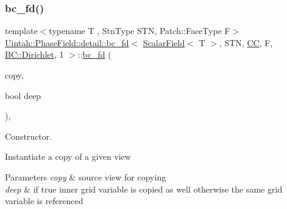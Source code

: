 \subsubsection{\texorpdfstring{bc\+\_\+fd()}{bc\_fd()}\hspace{0.1cm}{\footnotesize\ttfamily [1/3]}}
{\footnotesize\ttfamily template$<$typename T , Stn\+Type S\+TN, Patch\+::\+Face\+Type F$>$ \\
\hyperlink{classUintah_1_1PhaseField_1_1detail_1_1bc__fd}{Uintah\+::\+Phase\+Field\+::detail\+::bc\+\_\+fd}$<$ \hyperlink{structUintah_1_1PhaseField_1_1ScalarField}{Scalar\+Field}$<$ T $>$, S\+TN, \hyperlink{namespaceUintah_1_1PhaseField_a33d355affda78a83f45755ba8388cedda22303704507d024d1d6508ed9859a85a}{CC}, F, \hyperlink{namespaceUintah_1_1PhaseField_a148fba372aa3be96fd6eede7a2fa10b5abac152b762896edff34ed668ae1a546f}{B\+C\+::\+Dirichlet}, 1 $>$\+::\hyperlink{classUintah_1_1PhaseField_1_1detail_1_1bc__fd}{bc\+\_\+fd} (\begin{DoxyParamCaption}\item[{const \hyperlink{classUintah_1_1PhaseField_1_1detail_1_1bc__fd}{bc\+\_\+fd}$<$ \hyperlink{structUintah_1_1PhaseField_1_1ScalarField}{Scalar\+Field}$<$ T $>$, S\+TN, \hyperlink{namespaceUintah_1_1PhaseField_a33d355affda78a83f45755ba8388cedda22303704507d024d1d6508ed9859a85a}{CC}, F, \hyperlink{namespaceUintah_1_1PhaseField_a148fba372aa3be96fd6eede7a2fa10b5abac152b762896edff34ed668ae1a546f}{B\+C\+::\+Dirichlet}, 1 $>$ $\ast$}]{copy,  }\item[{bool}]{deep }\end{DoxyParamCaption})\hspace{0.3cm}{\ttfamily [inline]}, {\ttfamily [protected]}}



Constructor. 

Instantiate a copy of a given view


\begin{DoxyParams}{Parameters}
{\em copy} & source view for copying \\
\hline
{\em deep} & if true inner grid variable is copied as well otherwise the same grid variable is referenced \\
\hline
\end{DoxyParams}
\mbox{\label{classUintah_1_1PhaseField_1_1detail_1_1bc__fd_3_01ScalarField_3_01T_01_4_00_01STN_00_01CC_00_01Fa77b2fd7fb77d0a4dc6c86c68d4ea0bc_a3eed84729f860613e68776346aab0823}} 
